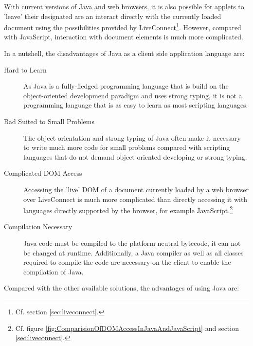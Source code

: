 With current versions of Java and web browsers, it is also possible for applets to 'leave' their designated are an interact directly with the currently loaded document using the possibilities provided by LiveConnect\footnote{Cf. section \ref{sec:liveconnect}.}. However, compared with JavaScript, interaction with document elements is much more complicated. 

In a nutshell, the disadvantages of Java as a client side application language are:

\begin{description}
	
	\item [Hard to Learn] As Java is a fully-fledged programming language that is build on the object-oriented developmend paradigm and uses strong typing, it is not a programming language that is as easy to learn as most scripting languages.
	
	\item [Bad Suited to Small Problems] The object orientation and strong typing of Java often make it necessary to write much more code for small problems compared with scripting languages that do not demand object oriented developing or strong typing.

	\item [Complicated DOM Access] Accessing the 'live' DOM of a document currently loaded by a web browser over LiveConnect is much more complicated than directly accessing it with languages directly supported by the browser, for example JavaScript.\footnote{Cf. figure \ref{fig:ComparisionOfDOMAccessInJavaAndJavaScript} and section \ref{sec:liveconnect}.}
	
	\item [Compilation Necessary] Java code must be compiled to the platform neutral bytecode, it can not be changed at runtime. Additionally, a Java compiler as well as all classes required to compile the code are necessary on the client to enable the compilation of Java.
	

\end{description}

Compared with the other available solutions, the advantages of using Java are:

